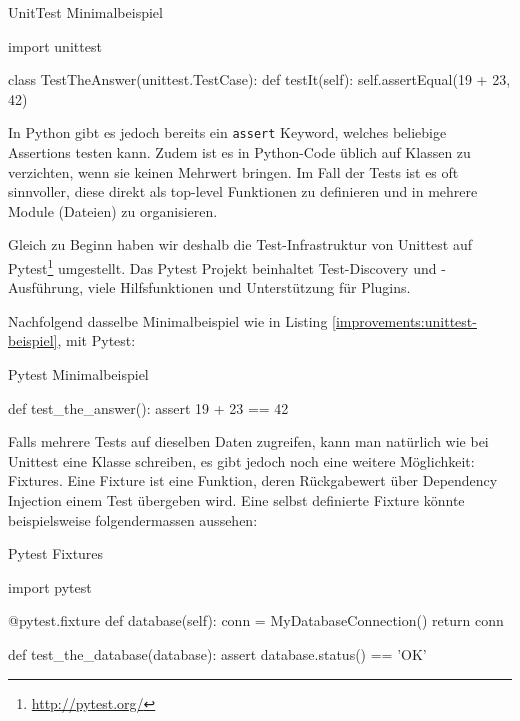 \begin{listing}
\caption{UnitTest Minimalbeispiel}
\label{improvements:unittest-beispiel}
\begin{pythoncode}
import unittest

class TestTheAnswer(unittest.TestCase):
    def testIt(self):
        self.assertEqual(19 + 23, 42)
\end{pythoncode}
\end{listing}

In Python gibt es jedoch bereits ein \texttt{assert} Keyword, welches beliebige
Assertions testen kann. Zudem ist es in Python-Code üblich auf Klassen zu
verzichten, wenn sie keinen Mehrwert bringen. Im Fall der Tests ist es oft
sinnvoller, diese direkt als top-level Funktionen zu definieren und in
mehrere Module (Dateien) zu organisieren.

Gleich zu Beginn haben wir deshalb die Test-Infrastruktur von Unittest auf
Pytest\footnote{\url{http://pytest.org/}} umgestellt. Das Pytest Projekt
beinhaltet Test-Discovery und -Ausführung, viele Hilfsfunktionen und
Unterstützung für Plugins.

Nachfolgend dasselbe Minimalbeispiel wie in Listing
\ref{improvements:unittest-beispiel}, mit Pytest:

\begin{listing}
\caption{Pytest Minimalbeispiel}
\label{improvements:pytest-beispiel}
\begin{pythoncode}
def test_the_answer():
    assert 19 + 23 == 42
\end{pythoncode}
\end{listing}

Falls mehrere Tests auf dieselben Daten zugreifen, kann man natürlich wie bei
Unittest eine Klasse schreiben, es gibt jedoch noch eine weitere Möglichkeit:
Fixtures. Eine Fixture ist eine Funktion, deren Rückgabewert über Dependency
Injection einem Test übergeben wird. Eine selbst definierte Fixture könnte
beispielsweise folgendermassen aussehen:

\begin{listing}
\caption{Pytest Fixtures}
\label{improvements:pytest-fixtures}
\begin{pythoncode}
import pytest

@pytest.fixture
def database(self):
    conn = MyDatabaseConnection()
    return conn

def test_the_database(database):
    assert database.status() == 'OK'
\end{pythoncode}
\end{listing}


